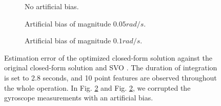 \documentclass[letterpaper, 10 pt, conference]{ieeeconf}  %
\begin{document}
\begin{figure}
  \centering
  \begin{subfigure}[b]{0.7\columnwidth}
   \resizebox{\columnwidth}{!}{}
    \caption{No artificial bias.\label{fig:valid}}
  \end{subfigure}
  \begin{subfigure}[b]{0.489\columnwidth}
    \resizebox{\columnwidth}{!}{}
    \caption{Artificial bias of magnitude $0.05 rad/s$.\label{fig:validBias1}}
  \end{subfigure}
  \begin{subfigure}[b]{0.489\columnwidth}
    \resizebox{\columnwidth}{!}{}
    \caption{Artificial bias of magnitude $0.1 rad/s$.\label{fig:validBias2}}
  \end{subfigure}
  \caption{Estimation error of the optimized closed-form solution against the original closed-form solution \cite{Martinelli2014} and SVO \cite{FaesslerICRA15}.
    The duration of integration is set to 2.8 seconds, and 10 point features are observed throughout the whole operation.
    In Fig. \ref{fig:validBias1} and Fig. \ref{fig:validBias1}, we corrupted the gyroscope measurements with an artificial bias.}

\end{figure}



\end{document}
